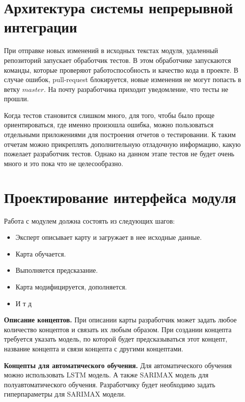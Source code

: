
\section{Архитектура системы непрерывной интеграции}

При отправке новых изменений в исходных текстах модуля,
удаленный репозиторий запускает обработчик тестов.
В этом обработчике запускаются команды, которые
проверяют работоспособность и качество кода в проекте.
В случае ошибок, pull-request блокируется, новые изменения не могут попасть
в ветку $ master $. На почту разработчика приходит уведомление, что
тесты не прошли.

Когда тестов становится слишком много, для того, чтобы было
проще ориентироваться, где именно произошла ошибка,
можно пользоваться отдельными приложениями для построения
отчетов о тестировании. К таким отчетам можно прикреплять
дополнительную отладочную информацию, какую пожелает разработчик тестов.
Однако на данном этапе тестов не будет очень много и это пока что не целесообразно.

\section{Проектирование интерфейса модуля}

Работа с модулем должна состоять из следующих шагов:
\begin{itemize}
	\item Эксперт описывает карту и загружает в нее исходные данные.
	\item Карта обучается.
	\item Выполняется предсказание.
	\item Карта модифицируется, дополняется.
	\item И т д
\end{itemize}

\textbf{Описание концептов.}
При описании карты разработчик может задать
любое количество концептов и связать их любым образом.
При создании концепта требуется указать модель,
по которой будет предсказываться этот концепт, название
концепта и связи концепта с другими концептами.

\textbf{Концепты для автоматического обучения.}
Для автоматического обучения можно использовать LSTM
модель. А также SARIMAX модель для полуавтоматического
обучения. Разработчику будет необходимо задать гиперпараметры
для SARIMAX модели.

